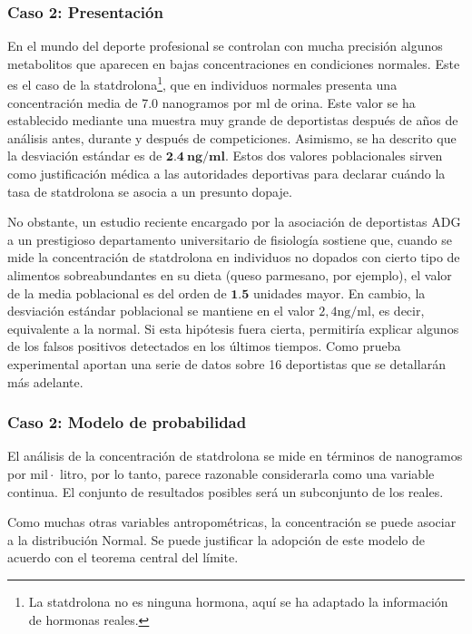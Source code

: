 \documentclass[
]{article}
\begin{document}
\subsubsection{Caso 2: Presentación}\label{caso-2-presentaciuxf3n}

En el mundo del deporte profesional se controlan con mucha precisión algunos metabolitos que aparecen en bajas concentraciones en condiciones normales. Este es el caso de la statdrolona\footnote{La statdrolona no es ninguna hormona, aquí se ha adaptado la información de hormonas reales.}, que en individuos normales presenta una concentración media de 7.0 nanogramos por ml de orina. Este valor se ha establecido mediante una muestra muy grande de deportistas después de años de análisis antes, durante y después de competiciones. Asimismo, se ha descrito que la desviación estándar es de \(\mathbf{2 . 4 ~ n g} / \mathbf{m l}\). Estos dos valores poblacionales sirven como justificación médica a las autoridades deportivas para declarar cuándo la tasa de statdrolona se asocia a un presunto dopaje.

No obstante, un estudio reciente encargado por la asociación de deportistas ADG a un prestigioso departamento universitario de fisiología sostiene que, cuando se mide la concentración de statdrolona en individuos no dopados con cierto tipo de alimentos sobreabundantes en su dieta (queso parmesano, por ejemplo), el valor de la media poblacional es del orden de \(\mathbf{1 . 5}\) unidades mayor. En cambio, la desviación estándar poblacional se mantiene en el valor \(2,4 \mathrm{ng} / \mathrm{ml}\), es decir, equivalente a la normal. Si esta hipótesis fuera cierta, permitiría explicar algunos de los falsos positivos detectados en los últimos tiempos. Como prueba experimental aportan una serie de datos sobre 16 deportistas que se detallarán más adelante.

\subsubsection{Caso 2: Modelo de probabilidad}\label{caso-2-modelo-de-probabilidad}

El análisis de la concentración de statdrolona se mide en términos de nanogramos por \(\mathrm{mil} \cdot\) litro, por lo tanto, parece razonable considerarla como una variable continua. El conjunto de resultados posibles será un subconjunto de los reales.

Como muchas otras variables antropométricas, la concentración se puede asociar a la distribución Normal. Se puede justificar la adopción de este modelo de acuerdo con el teorema central del límite.
\end{document}
